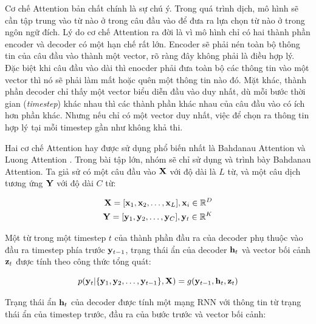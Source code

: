 \documentclass[14pt, a4paper]{article}
\numberwithin{equation}{section}
\numberwithin{algorithm}{section}
\numberwithin{figure}{section}
\numberwithin{dl}{section}
\numberwithin{md}{section}
\numberwithin{bd}{section}
\numberwithin{dn}{section}
\numberwithin{hq}{section}
\begin{document}
    Cơ chế Attention bản chất chính là sự chú ý. Trong quá trình dịch, mô hình sẽ cần tập trung vào từ nào ở trong câu đầu vào để đưa ra lựa chọn từ nào ở trong ngôn ngữ đích.
    Lý do cơ chế Attention ra đời là vì mô hình chỉ có hai thành phần encoder và decoder có một hạn chế rất lớn. Encoder sẽ phải nén toàn bộ thông tin của câu đầu vào thành một vector, rõ ràng đây không phải là điều hợp lý.
    Đặc biệt khi câu đầu vào dài thì enocder phải đưa toàn bộ các thông tin vào một vector thì nó sẽ phải làm mất hoặc quên một thông tin nào đó.
    Mặt khác, thành phần decoder chỉ thấy một vector biểu diễn đầu vào duy nhất, dù mỗi bước thời gian (\textit{timestep}) khác nhau thì các thành phần khác nhau của câu đầu vào có ích hơn phần khác.
    Nhưng nếu chỉ có một vector duy nhất, việc để chọn ra thông tin hợp lý tại mỗi timestep gần như không khả thi.

    Hai cơ chế Attention hay được sử dụng phổ biến nhất là Bahdanau Attention \cite{bahdanau2014neural} và Luong Attention \cite{luong2014addressing}. Trong bài tập lớn, nhóm sẽ chỉ sử dụng và trình bày Bahdanau Attention.
    Ta giả sử có một câu đầu vào $\bold{X}$ với độ dài là $L$ từ, và một câu dịch tương ứng $\bold{Y}$ với độ dài $C$ từ:

    \begin{equation}
        \begin{aligned}
            \bold{X} = \lbrack \bold{x}_1, \bold{x}_2, \dots, \bold{x}_L \rbrack, \bold{x}_i \in \mathbb{R}^D \\
            \bold{Y} = \lbrack \bold{y}_1, \bold{y}_2, \dots, \bold{y}_C \rbrack, \bold{y}_t \in \mathbb{R}^K
        \end{aligned}
    \end{equation}

    Một từ trong một timestep $t$ của thành phần đầu ra của decoder phụ thuộc vào đầu ra timestep phía trước $\bold{y}_{t-1}$, trạng thái ẩn của decoder $\bold{h}_t$ và vector bối cảnh $\bold{z}_t$ được tính theo công thức tổng quát:

    \begin{equation}
        p(\bold{y}_t \vert \lbrace \bold{y}_1, \bold{y}_2, \dots, \bold{y}_{t-1} \rbrace, \bold{X}) = g(\bold{y}_{t-1}, \bold{h}_t, \bold{z}_t)
    \end{equation}

    Trạng thái ẩn $\bold{h}_t$ của decoder được tính một mạng RNN với thông tin từ trạng thái ẩn của timestep trước, đầu ra của bước trước và vector bối cảnh:
    
\end{document}
